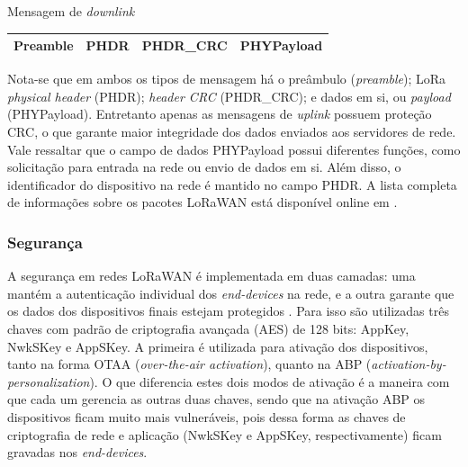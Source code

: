 \documentclass[oneside,openright,12pt]{ufsm_2015} %
\begin{document}
\begin{quadro}
   	    \caption{Mensagem de \textit{downlink}}
	    \centering
	    \begin{tabular}{| c | c | c | c |}
	    \hline
	    Preamble & PHDR & PHDR\_CRC & PHYPayload \\
	    \hline
	    \end{tabular}
	    \vspace{\baselineskip} %
	    \label{downlink-msg}
\end{quadro}

Nota-se que em ambos os tipos de mensagem há o preâmbulo (\textit{preamble}); LoRa \textit{physical header} (PHDR); \textit{header CRC} (PHDR\_CRC); e dados em si, ou \textit{payload} (PHYPayload). Entretanto apenas as mensagens de \textit{uplink} possuem proteção CRC, o que garante maior integridade dos dados enviados aos servidores de rede. Vale ressaltar que o campo de dados PHYPayload possui diferentes funções, como solicitação para entrada na rede ou envio de dados em si. Além disso, o identificador do dispositivo na rede é mantido no campo PHDR. A lista completa de informações sobre os pacotes LoRaWAN está disponível online em \cite{lorawan-specification}.


\subsubsection{Segurança}
A segurança em redes LoRaWAN é implementada em duas camadas: uma mantém a autenticação individual dos \textit{end-devices} na rede, e a outra garante que os dados dos dispositivos finais estejam protegidos \cite{lora-overview}. Para isso são utilizadas três chaves com padrão de criptografia avançada (AES) de 128 bits:  AppKey, NwkSKey e AppSKey. A primeira é utilizada para ativação dos dispositivos, tanto na forma OTAA (\textit{over-the-air activation}), quanto na ABP (\textit{activation-by-personalization}). O que diferencia estes dois modos de ativação é a maneira com que cada um gerencia as outras duas chaves, sendo que na ativação ABP os dispositivos ficam muito mais vulneráveis, pois dessa forma as chaves de criptografia de rede e aplicação (NwkSKey e AppSKey, respectivamente) ficam gravadas nos \textit{end-devices}.
\end{document}
